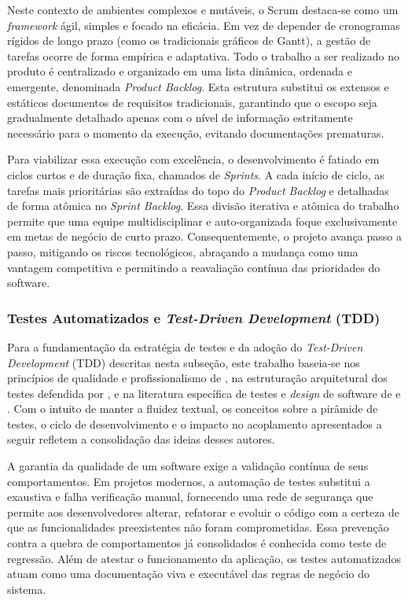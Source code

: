 Neste contexto de ambientes complexos e mutáveis, o Scrum destaca-se como um \textit{framework} ágil, simples e focado na eficácia. Em vez de depender de cronogramas rígidos de longo prazo (como os tradicionais gráficos de Gantt), a gestão de tarefas ocorre de forma empírica e adaptativa. Todo o trabalho a ser realizado no produto é centralizado e organizado em uma lista dinâmica, ordenada e emergente, denominada \textit{Product Backlog}. Esta estrutura substitui os extensos e estáticos documentos de requisitos tradicionais, garantindo que o escopo seja gradualmente detalhado apenas com o nível de informação estritamente necessário para o momento da execução, evitando documentações prematuras. %

Para viabilizar essa execução com excelência, o desenvolvimento é fatiado em ciclos curtos e de duração fixa, chamados de \textit{Sprints}. A cada início de ciclo, as tarefas mais prioritárias são extraídas do topo do \textit{Product Backlog} e detalhadas de forma atômica no \textit{Sprint Backlog}. Essa divisão iterativa e atômica do trabalho permite que uma equipe multidisciplinar e auto-organizada foque exclusivamente em metas de negócio de curto prazo. Consequentemente, o projeto avança passo a passo, mitigando os riscos tecnológicos, abraçando a mudança como uma vantagem competitiva e permitindo a reavaliação contínua das prioridades do software. %


\subsubsection{Testes Automatizados e \textit{Test-Driven Development} (TDD)}

Para a fundamentação da estratégia de testes e da adoção do \textit{Test-Driven Development} (TDD) descritas nesta subseção, este trabalho baseia-se nos princípios de qualidade e profissionalismo de , na estruturação arquitetural dos testes defendida por , e na literatura específica de testes e \textit{design} de software de  e . Com o intuito de manter a fluidez textual, os conceitos sobre a pirâmide de testes, o ciclo de desenvolvimento e o impacto no acoplamento apresentados a seguir refletem a consolidação das ideias desses autores. %

A garantia da qualidade de um software exige a validação contínua de seus comportamentos. Em projetos modernos, a automação de testes substitui a exaustiva e falha verificação manual, fornecendo uma rede de segurança que permite aos desenvolvedores alterar, refatorar e evoluir o código com a certeza de que as funcionalidades preexistentes não foram comprometidas. Essa prevenção contra a quebra de comportamentos já consolidados é conhecida como teste de regressão. Além de atestar o funcionamento da aplicação, os testes automatizados atuam como uma documentação viva e executável das regras de negócio do sistema. %

